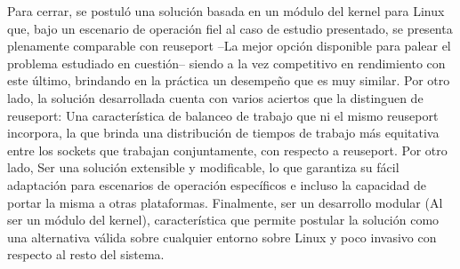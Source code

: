 \begin{conclusion}
 
Para cerrar, se postuló una solución basada en un módulo del kernel para Linux que, bajo un escenario de operación fiel al caso de estudio presentado, se presenta plenamente comparable con reuseport --La mejor opción disponible para palear el problema estudiado en cuestión-- siendo a la vez competitivo en rendimiento con este último, brindando en la práctica un desempeño que es muy similar. Por otro lado, la solución desarrollada cuenta con varios aciertos que la distinguen de reuseport: Una característica de balanceo de trabajo que ni el mismo reuseport incorpora, la que brinda una distribución de tiempos de trabajo más equitativa entre los sockets que trabajan conjuntamente, con respecto a reuseport. Por otro lado, Ser una solución extensible y modificable, lo que garantiza su fácil adaptación para escenarios de operación específicos e incluso la capacidad de portar la misma a otras plataformas. Finalmente, ser un desarrollo modular (Al ser un módulo del kernel), característica que permite postular la solución como una alternativa válida sobre cualquier entorno sobre Linux y poco invasivo con respecto al resto del sistema.

\end{conclusion}